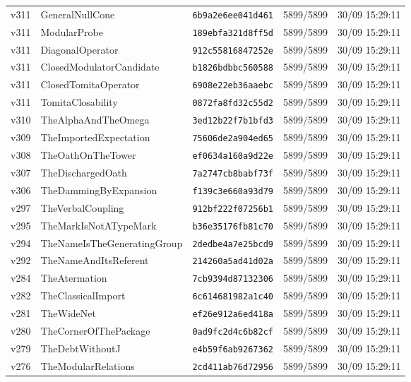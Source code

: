 \documentclass[11pt]{article}
\theoremstyle{definition}\newtheorem{deriv}{Derivation}
\begin{document}
{\begin{longtable}{@{}lllll@{}}
v311 & GeneralNullCone & \texttt{6b9a2e6ee041d461} & 5899/5899 & 30/09 15:29:11 \\
v311 & ModularProbe & \texttt{189ebfa321d8ff5d} & 5899/5899 & 30/09 15:29:11 \\
v311 & DiagonalOperator & \texttt{912c55816847252e} & 5899/5899 & 30/09 15:29:11 \\
v311 & ClosedModulatorCandidate & \texttt{b1826bdbbc560588} & 5899/5899 & 30/09 15:29:11 \\
v311 & ClosedTomitaOperator & \texttt{6908e22eb36aaebc} & 5899/5899 & 30/09 15:29:11 \\
v311 & TomitaClosability & \texttt{0872fa8fd32c55d2} & 5899/5899 & 30/09 15:29:11 \\
v310 & TheAlphaAndTheOmega & \texttt{3ed12b22f7b1bfd3} & 5899/5899 & 30/09 15:29:11 \\
v309 & TheImportedExpectation & \texttt{75606de2a904ed65} & 5899/5899 & 30/09 15:29:11 \\
v308 & TheOathOnTheTower & \texttt{ef0634a160a9d22e} & 5899/5899 & 30/09 15:29:11 \\
v307 & TheDischargedOath & \texttt{7a2747cb8babf73f} & 5899/5899 & 30/09 15:29:11 \\
v306 & TheDammingByExpansion & \texttt{f139c3e660a93d79} & 5899/5899 & 30/09 15:29:11 \\
v297 & TheVerbalCoupling & \texttt{912bf222f07256b1} & 5899/5899 & 30/09 15:29:11 \\
v295 & TheMarkIsNotATypeMark & \texttt{b36e35176fb81c70} & 5899/5899 & 30/09 15:29:11 \\
v294 & TheNameIsTheGeneratingGroup & \texttt{2dedbe4a7e25bcd9} & 5899/5899 & 30/09 15:29:11 \\
v292 & TheNameAndItsReferent & \texttt{214260a5ad41d02a} & 5899/5899 & 30/09 15:29:11 \\
v284 & TheAtermation & \texttt{7cb9394d87132306} & 5899/5899 & 30/09 15:29:11 \\
v282 & TheClassicalImport & \texttt{6c614681982a1c40} & 5899/5899 & 30/09 15:29:11 \\
v281 & TheWideNet & \texttt{ef26e912a6ed418a} & 5899/5899 & 30/09 15:29:11 \\
v280 & TheCornerOfThePackage & \texttt{0ad9fc2d4c6b82cf} & 5899/5899 & 30/09 15:29:11 \\
v279 & TheDebtWithoutJ & \texttt{e4b59f6ab9267362} & 5899/5899 & 30/09 15:29:11 \\
v276 & TheModularRelations & \texttt{2cd411ab76d72956} & 5899/5899 & 30/09 15:29:11 \\

\end{longtable}}
\end{document}
